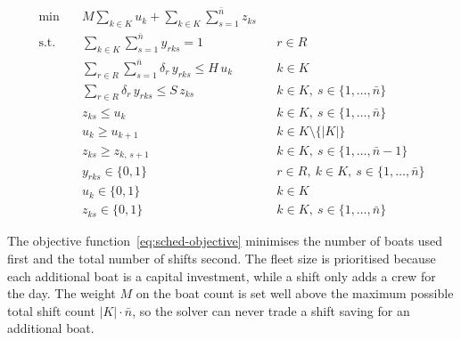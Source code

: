 \documentclass[12pt]{article}
\begin{document}
\begin{align}
  \min \quad & M \sum_{k \in K} u_k + \sum_{k \in K} \sum_{s = 1}^{\bar{n}} z_{ks} \label{eq:sched-objective}                                                                                 \\
  \text{s.t.} \quad
             & \sum_{k \in K} \sum_{s = 1}^{\bar{n}} y_{rks} = 1                                              &  & r \in R \label{eq:sched-assign}                                            \\
             & \sum_{r \in R} \sum_{s = 1}^{\bar{n}} \delta_r \, y_{rks} \leq H \, u_k                        &  & k \in K \label{eq:sched-day}                                               \\
             & \sum_{r \in R} \delta_r \, y_{rks} \leq S \, z_{ks}                                            &  & k \in K,\ s \in \{1, \ldots, \bar{n}\} \label{eq:sched-shift}              \\
             & z_{ks} \leq u_k                                                                                &  & k \in K,\ s \in \{1, \ldots, \bar{n}\} \label{eq:sched-link}               \\
             & u_k \geq u_{k+1}                                                                               &  & k \in K \setminus \{|K|\} \label{eq:sched-symmetry-boat}                   \\
             & z_{ks} \geq z_{k,\,s+1}                                                                        &  & k \in K,\ s \in \{1, \ldots, \bar{n} - 1\} \label{eq:sched-symmetry-shift} \\
             & y_{rks} \in \{0,1\}                                                                            &  & r \in R,\ k \in K,\ s \in \{1, \ldots, \bar{n}\} \label{eq:sched-y-binary} \\
             & u_k \in \{0,1\}                                                                                &  & k \in K \label{eq:sched-u-binary}                                          \\
             & z_{ks} \in \{0,1\}                                                                             &  & k \in K,\ s \in \{1, \ldots, \bar{n}\} \label{eq:sched-z-binary}
\end{align}

The objective function~\eqref{eq:sched-objective} minimises the number of boats used first and the total number of shifts second. The fleet size is prioritised because each additional boat is a capital investment, while a shift only adds a crew for the day. The weight \(M\) on the boat count is set well above the maximum possible total shift count \(|K| \cdot \bar{n}\), so the solver can never trade a shift saving for an additional boat.
\end{document}
